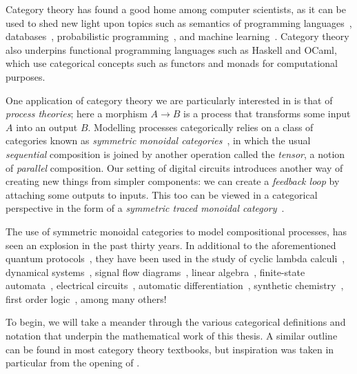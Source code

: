 Category theory has found a good home among computer scientists, as
it can be used to shed new light upon topics such as semantics of programming
languages~\cite{oles1982categorytheoretic}, databases~\cite{spivak2012functorial},
probabilistic programming~\cite{cho2019disintegration,fritz2020synthetic}, and
machine learning~\cite{fong2019backprop,cockett2020reverse}.
Category theory also underpins functional programming languages such as
Haskell and OCaml, which use categorical concepts such as functors and monads
for computational purposes.

One application of category theory we are particularly interested in is that of
\emph{process theories}; here a morphism \(A \to B\) is a process that
transforms some input \(A\) into an output \(B\).
Modelling processes categorically relies on a class of categories known as
\emph{symmetric monoidal categories}~\cite{maclane1963natural}, in which the
usual \emph{sequential} composition is joined by another operation called the
\emph{tensor}, a notion of \emph{parallel} composition.
Our setting of digital circuits introduces another way of creating new things
from simpler components: we can create a \emph{feedback loop} by attaching some
outputs to inputs.
This too can be viewed in a categorical perspective in the form of a
\emph{symmetric traced monoidal category}~\cite{joyal1996traced}.

The use of symmetric monoidal categories to model compositional processes, has
seen an explosion in the past thirty years.
In additional to the aforementioned quantum protocols~\cite{coecke2008interacting},
they have been used in the study of cyclic lambda
calculi~\cite{hasegawa1997recursion}, dynamical
systems~\cite{baez2015categories,fong2016categorical}, signal flow
diagrams~\cite{bonchi2014categorical,bonchi2015full,bonchi2017refinement,bonchi2021survey},
linear algebra~\cite{bonchi2017interacting,zanasi2015interacting,bonchi2019graphical,boisseau2022graphical},
finite-state automata~\cite{piedeleu2021string,piedeleu2022finite}, electrical
circuits~\cite{boisseau2022string}, automatic
differentiation~\cite{alvarez-picallo2023functorial}, synthetic
chemistry~\cite{gale2023categorical}, first order
logic~\cite{bonchi2024diagrammatic}, among many others!

To begin, we will take a meander through the various categorical definitions and
notation that underpin the mathematical work of this thesis.
A similar outline can be found in most category theory textbooks, but
inspiration was taken in particular from the opening of
\cite{ghica2023hierarchical}.









